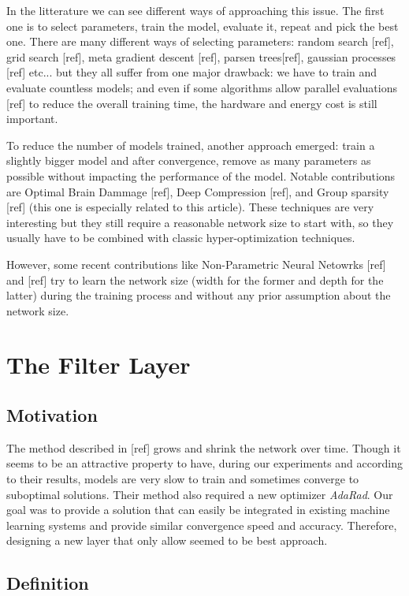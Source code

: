 \documentclass[sigconf]{acmart}
\begin{document}
\par In the litterature we can see different ways of approaching this issue. The first one is to select parameters, train the model, evaluate it, repeat and pick the best one. There are many different ways of selecting parameters: random search [ref], grid search [ref], meta gradient descent [ref], parsen trees[ref], gaussian processes [ref] etc... but they all suffer from one major drawback: we have to train and evaluate countless models; and even if some algorithms allow parallel evaluations [ref] to reduce the overall training time, the hardware and energy cost is still important.
\par To reduce the number of models trained, another approach emerged: train a slightly bigger model and after convergence, remove as many parameters as possible without impacting the performance of the model. Notable contributions are Optimal Brain Dammage [ref], Deep Compression [ref], and Group sparsity [ref] (this one is especially related to this article). These techniques are very interesting but they still require a reasonable network size to start with, so they usually have to be combined with classic hyper-optimization techniques.
\par However, some recent contributions like Non-Parametric Neural Netowrks [ref] and [ref] try to learn the network size (width for the former and depth for the latter) during the training process and without any prior assumption about the network size.

\section{The Filter Layer}
\subsection{Motivation}

The method described in [ref] grows and shrink the network over time. Though it seems to be an attractive property to have, during our experiments and according to their results, models are very slow to train and sometimes converge to suboptimal solutions. Their method also required a new optimizer \textit{AdaRad}. Our goal was to provide a solution that can easily be integrated in existing machine learning systems and provide similar convergence speed and accuracy. Therefore, designing a new layer that only allow seemed to be best approach.

\subsection{Definition}
\end{document}
